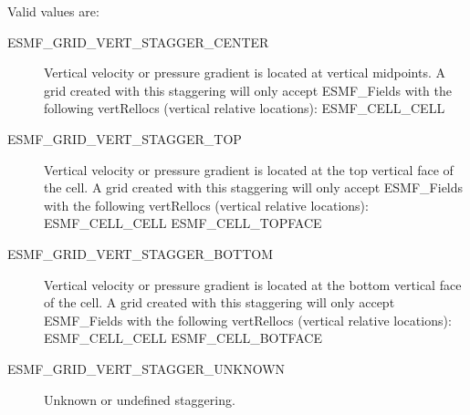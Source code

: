 Valid values are:
\begin{description}

   \item [ESMF\_GRID\_VERT\_STAGGER\_CENTER] 
         Vertical velocity or pressure gradient is located at vertical midpoints.
         A grid created with this staggering will only accept ESMF\_Fields with
         the following vertRellocs (vertical relative locations):
             ESMF\_CELL\_CELL

   \item [ESMF\_GRID\_VERT\_STAGGER\_TOP]
         Vertical velocity or pressure gradient is located at the top vertical 
         face of the cell.  A grid created with this staggering will only accept
         ESMF\_Fields with the following vertRellocs (vertical relative
         locations):
             ESMF\_CELL\_CELL
             ESMF\_CELL\_TOPFACE

   \item [ESMF\_GRID\_VERT\_STAGGER\_BOTTOM]
         Vertical velocity or pressure gradient is located at the bottom vertical 
         face of the cell.  A grid created with this staggering will only accept
         ESMF\_Fields with the following vertRellocs (vertical relative
         locations):
             ESMF\_CELL\_CELL
             ESMF\_CELL\_BOTFACE

   \item [ESMF\_GRID\_VERT\_STAGGER\_UNKNOWN]
         Unknown or undefined staggering.

\end{description}


% 
% 



